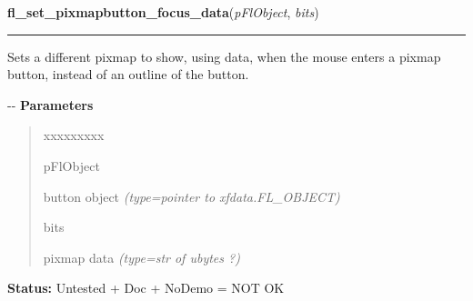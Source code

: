 \hspace{.8\funcindent}\begin{boxedminipage}{\funcwidth}

    \raggedright \textbf{fl\_set\_pixmapbutton\_focus\_data}(\textit{pFlObject}, \textit{bits})

    \vspace{-1.5ex}

    \rule{\textwidth}{0.5\fboxrule}
\setlength{\parskip}{2ex}

Sets a different pixmap to show, using data, when the mouse enters
a pixmap button, instead of an outline of the button.

-{}-
\setlength{\parskip}{1ex}
      \textbf{Parameters}
      \vspace{-1ex}

      \begin{quote}
        \begin{Ventry}{xxxxxxxxx}

          \item[pFlObject]


button object
            {\it (type=pointer to xfdata.FL\_OBJECT)}

          \item[bits]


pixmap data
            {\it (type=str of ubytes ?)}

        \end{Ventry}

      \end{quote}

\textbf{Status:} 
Untested + Doc + NoDemo = NOT OK


    \end{boxedminipage}

    \label{xformslib:flbutton:fl_set_pixmapbutton_focus_file}

    \vspace{0.5ex}

